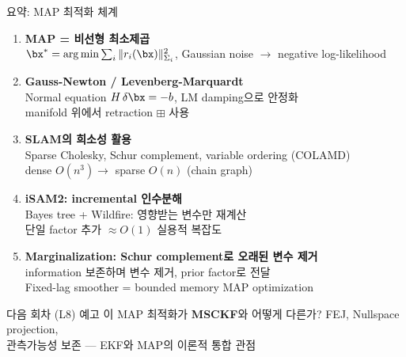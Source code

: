 \begin{frame}[shrink=20]{요약: MAP 최적화 체계}
  \begin{enumerate}
    \setlength\itemsep{0.5em}
    \item \textbf{MAP = 비선형 최소제곱}\\
      $\bx^* = \arg\min \sum_i \|r_i(\bx)\|_{\Sigma_i}^2$,
      Gaussian noise $\to$ negative log-likelihood
    \pause
    \item \textbf{Gauss-Newton / Levenberg-Marquardt}\\
      Normal equation $H\,\delta\bx = -b$, LM damping으로 안정화\\
      manifold 위에서 retraction $\boxplus$ 사용
    \pause
    \item \textbf{SLAM의 희소성 활용}\\
      Sparse Cholesky, Schur complement, variable ordering (COLAMD)\\
      dense $O(n^3) \to$ sparse $O(n)$ (chain graph)
    \pause
    \item \textbf{iSAM2: incremental 인수분해}\\
      Bayes tree + Wildfire: 영향받는 변수만 재계산\\
      단일 factor 추가 $\approx O(1)$ 실용적 복잡도
    \pause
    \item \textbf{Marginalization: Schur complement로 오래된 변수 제거}\\
      information 보존하며 변수 제거, prior factor로 전달\\
      Fixed-lag smoother = bounded memory MAP optimization
  \end{enumerate}
  \pause
  \vspace{0.3em}
  \begin{alertblock}{다음 회차 (L8) 예고}
    이 MAP 최적화가 \textbf{MSCKF}와 어떻게 다른가? FEJ, Nullspace projection,\\
    관측가능성 보존 — EKF와 MAP의 이론적 통합 관점
  \end{alertblock}
\end{frame}


